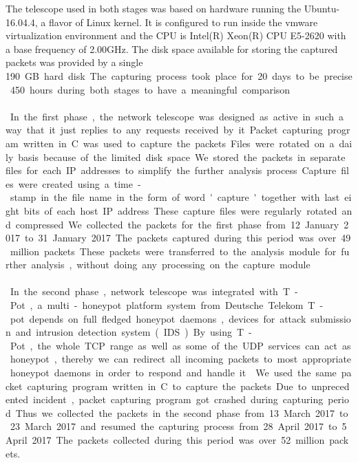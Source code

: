 The telescope used in both stages was  based on hardware running the Ubuntu-16.04.4, a flavor of Linux kernel.
It is configured to run inside the vmware virtualization environment and the CPU is  Intel(R) Xeon(R) CPU E5-2620 with a base frequency of 2.00GHz.
The disk space available for storing the captured packets was provided by a single \SI{190} GB hard disk.
The capturing process took place for 20 days to be precise 450 hours during both stages to have a meaningful comparison. \\\\
In the first phase, the network telescope  was  designed  as  active  in  such  a  way  that  it just replies to any requests received by it.
Packet capturing program written in C was used to capture the packets. 
Files were rotated on a daily basis because of the limited disk space. 
We stored the packets in separate files for each IP addresses to simplify the further analysis process.
Capture files were created using a time-stamp in the file name in the form of word 'capture' together with last eight bits of each host IP address.
These capture files were regularly rotated and compressed.
We collected the packets for the first phase from 12 January 2017 to 31 January 2017.
The packets captured during this period was over 49 million packets.
These packets were transferred to the analysis module for further analysis, without doing any processing on the capture module.\\\\
In the second phase, network telescope was integrated with T-Pot,  a multi-honeypot platform system from Deutsche Telekom. 
T-pot depends on full fledged honeypot daemons, devices for attack submission and intrusion detection system (IDS).
By using T-Pot, the whole TCP range as well as some of the UDP services can act as honeypot, thereby we can redirect all incoming packets to most appropriate honeypot daemons in order to respond and handle it \cite{tpot}.
We used the same packet capturing program written in C to capture the packets.
Due to unprecedented incident, packet capturing program got crashed during capturing period.
Thus we collected the packets in the second phase from 13 March 2017 to 23 March 2017 and resumed the capturing process from 28 April 2017 to 5 April 2017.
The packets collected during this period was over 52 million packets.